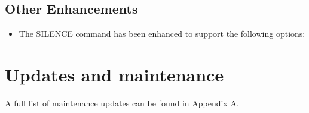 \documentclass[letterpaper,10pt,english]{sphinxmanual}
\begin{document}
\section{Other Enhancements}
\label{\detokenize{TN202003:other-enhancements}}
\begin{itemize}
\item {} 
The SILENCE command has been enhanced to support the following options:

\begin{sphinxVerbatim}[commandchars=\\\{\}]
          
        
                
             
\end{sphinxVerbatim}

\end{itemize}


\chapter{Updates and maintenance}
\label{\detokenize{TN202003:updates-and-maintenance}}
A full list of maintenance updates can be found in Appendix A.
\end{document}
